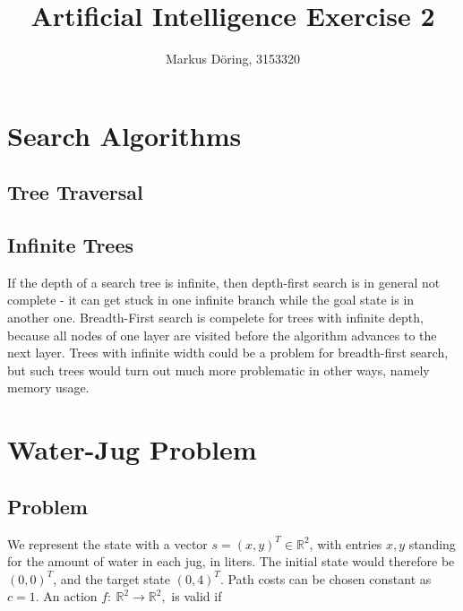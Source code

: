 \documentclass[11pt,a4paper]{scrartcl}
\newcommand{\IR}{\mathbb{R}}
\newcommand{\map}{\rightarrow}
\begin{document}
\title{Artificial Intelligence Exercise 2}
\author{Markus Döring, 3153320}
\maketitle

\section{Search Algorithms}
\subsection{Tree Traversal}

\subsection{Infinite Trees}

If the depth of a search tree is infinite, then depth-first search is in general 
not complete - it can get stuck in one infinite branch while the goal state is 
in another one. Breadth-First search is compelete for trees with infinite depth, 
because all nodes of one layer are visited before the algorithm advances to the 
next layer. Trees with infinite width could be a problem for breadth-first search, 
but such trees would turn out much more problematic in other ways, namely memory 
usage.

\section{Water-Jug Problem}

\subsection{Problem}
We represent the state with a vector $s = (x,y)^T\in\IR^2$, with entries $x,y$ standing 
for the amount of water in each jug, in liters. The initial state would therefore 
be $(0,0)^T$, and the target state $(0,4)^T$. Path costs can be chosen constant 
as $c=1$. An action $f:\ \IR^2\map\IR^2,$ is valid if
\end{document}
